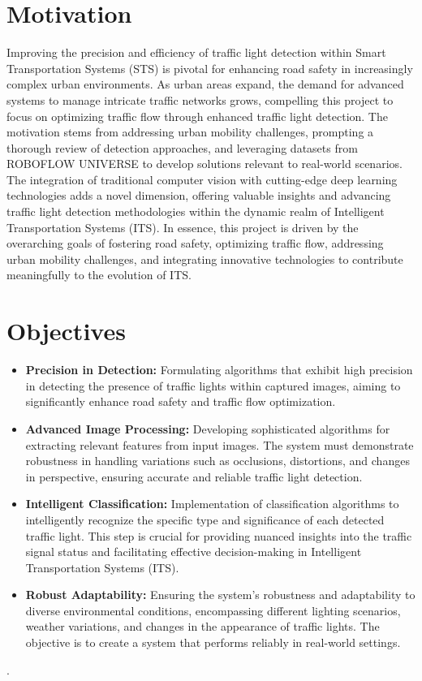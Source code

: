 \documentclass[12 pt]{report}
\begin{document}
\section{Motivation}
Improving the precision and efficiency of traffic light detection within Smart Transportation Systems (STS) is pivotal for enhancing road safety in increasingly complex urban environments. As urban areas expand, the demand for advanced systems to manage intricate traffic networks grows, compelling this project to focus on optimizing traffic flow through enhanced traffic light detection. The motivation stems from addressing urban mobility challenges, prompting a thorough review of detection approaches, and leveraging datasets from ROBOFLOW UNIVERSE to develop solutions relevant to real-world scenarios. The integration of traditional computer vision with cutting-edge deep learning technologies adds a novel dimension, offering valuable insights and advancing traffic light detection methodologies within the dynamic realm of Intelligent Transportation Systems (ITS). In essence, this project is driven by the overarching goals of fostering road safety, optimizing traffic flow, addressing urban mobility challenges, and integrating innovative technologies to contribute meaningfully to the evolution of ITS.
\flushleft
\section{Objectives}

\begin{itemize}
  \item \textbf{Precision in Detection:} Formulating algorithms that exhibit high precision in detecting the presence of traffic lights within captured images, aiming to significantly enhance road safety and traffic flow optimization.

  \item \textbf{Advanced Image Processing:} Developing sophisticated algorithms for extracting relevant features from input images. The system must demonstrate robustness in handling variations such as occlusions, distortions, and changes in perspective, ensuring accurate and reliable traffic light detection.

  \item \textbf{Intelligent Classification:} Implementation of classification algorithms to intelligently recognize the specific type and significance of each detected traffic light. This step is crucial for providing nuanced insights into the traffic signal status and facilitating effective decision-making in Intelligent Transportation Systems (ITS).

  \item \textbf{Robust Adaptability:} Ensuring the system's robustness and adaptability to diverse environmental conditions, encompassing different lighting scenarios, weather variations, and changes in the appearance of traffic lights. The objective is to create a system that performs reliably in real-world settings.
\end{itemize}.
\end{document}
